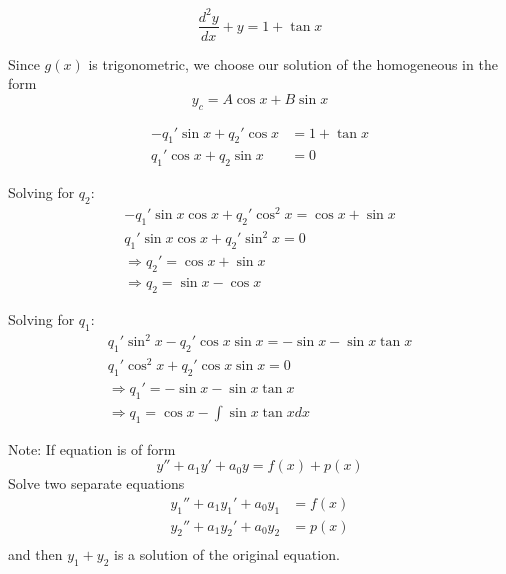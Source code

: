 \documentclass[a4paper,10pt]{article}
\begin{document}
\begin{ex}
	\[
		\frac{d^2y}{dx} + y = 1 + \tan x
	\]

	Since $g(x)$ is trigonometric, we choose our solution of the
	homogeneous in the form
	\[
		y_c = A\cos x + B\sin x
	\]

	\begin{align*}
		-q_1'\sin x + q_2'\cos x &= 1 + \tan x \\
		q_1'\cos x + q_2\sin x &= 0
	\end{align*}

	Solving for $q_2$:
	\begin{gather*}
		-q_1'\sin x \cos x + q_2'\cos^2x = \cos x + \sin x \\
		q_1' \sin x \cos x + q_2'\sin^2x = 0\\
		\Rightarrow q_2' = \cos x + \sin x \\
		\Rightarrow q_2 = \sin x - \cos x
	\end{gather*}

	Solving for $q_1$:
	\begin{gather*}
		q_1'\sin^2x - q_2'\cos x \sin x = -\sin x - \sin x \tan x \\
		q_1'\cos^2x + q_2'\cos x \sin x = 0 \\
		\Rightarrow q_1' = -\sin x - \sin x \tan x \\
		\Rightarrow q_1 = \cos x - \int \sin x \tan x dx
	\end{gather*}
\end{ex}

Note:
If equation is of form
\[
	y'' + a_1y' + a_0y = f(x) + p(x)
\]
Solve two separate equations
\begin{align*}
	y_1'' + a_1y_1' + a_0y_1 &= f(x) \\
	y_2'' + a_1y_2' + a_0y_2 &= p(x) \\
\end{align*}
and then $y_1 + y_2$ is a solution of the original equation.
\end{document}
